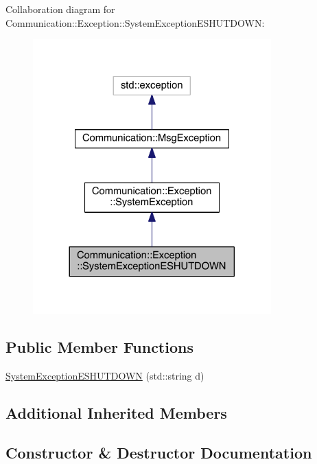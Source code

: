 Collaboration diagram for Communication\+:\+:Exception\+:\+:System\+Exception\+E\+S\+H\+U\+T\+D\+O\+W\+N\+:\nopagebreak
\begin{figure}[H]
\begin{center}
\leavevmode
\includegraphics[width=260pt]{class_communication_1_1_exception_1_1_system_exception_e_s_h_u_t_d_o_w_n__coll__graph}
\end{center}
\end{figure}
\subsection*{Public Member Functions}
\begin{DoxyCompactItemize}
\item 
\hyperlink{class_communication_1_1_exception_1_1_system_exception_e_s_h_u_t_d_o_w_n_aac2890adba9af94c6619364bfa81e4f5}{System\+Exception\+E\+S\+H\+U\+T\+D\+O\+W\+N} (std\+::string d)
\end{DoxyCompactItemize}
\subsection*{Additional Inherited Members}


\subsection{Constructor \& Destructor Documentation}
\hypertarget{class_communication_1_1_exception_1_1_system_exception_e_s_h_u_t_d_o_w_n_aac2890adba9af94c6619364bfa81e4f5}{}
